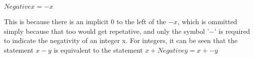 \begin{center}
$Negative x = -x$
\end{center}
This is because there is an implicit $0$ to the left of the $-x$, which is ommitted simply because that too would get repetative, and only the symbol '$-$' is required to indicate the negativity of an integer x. For integers, it can be seen that the statement $x-y$ is equivalent to the statement $x+Negative y = x+ -y$
































